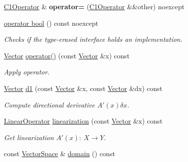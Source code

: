 \begin{DoxyCompactItemize}
\item 
\hyperlink{classSpacy_1_1C1Operator}{C1\+Operator} \& {\bfseries operator=} (\hyperlink{classSpacy_1_1C1Operator}{C1\+Operator} \&\&other) noexcept\hypertarget{classSpacy_1_1C1Operator_abc661d2a55983098267ddd90bd9673eb}{}\label{classSpacy_1_1C1Operator_abc661d2a55983098267ddd90bd9673eb}

\item 
\hyperlink{classSpacy_1_1C1Operator_a4efdf099aac5f0b101c69cc8c9c8a48b}{operator bool} () const noexcept
\begin{DoxyCompactList}\small\item\em Checks if the type-\/erased interface holds an implementation. \end{DoxyCompactList}\item 
\hyperlink{classSpacy_1_1Vector}{Vector} \hyperlink{classSpacy_1_1C1Operator_a2a01bf08bf2b6e44955cd606aa3db91d}{operator()} (const \hyperlink{classSpacy_1_1Vector}{Vector} \&x) const \hypertarget{classSpacy_1_1C1Operator_a2a01bf08bf2b6e44955cd606aa3db91d}{}\label{classSpacy_1_1C1Operator_a2a01bf08bf2b6e44955cd606aa3db91d}

\begin{DoxyCompactList}\small\item\em Apply operator. \end{DoxyCompactList}\item 
\hyperlink{classSpacy_1_1Vector}{Vector} \hyperlink{classSpacy_1_1C1Operator_a1b6a06c88bc4168c750ee4ffdc81f1dd}{d1} (const \hyperlink{classSpacy_1_1Vector}{Vector} \&x, const \hyperlink{classSpacy_1_1Vector}{Vector} \&dx) const \hypertarget{classSpacy_1_1C1Operator_a1b6a06c88bc4168c750ee4ffdc81f1dd}{}\label{classSpacy_1_1C1Operator_a1b6a06c88bc4168c750ee4ffdc81f1dd}

\begin{DoxyCompactList}\small\item\em Compute directional derivative $A'(x)\delta x$. \end{DoxyCompactList}\item 
\hyperlink{classSpacy_1_1LinearOperator}{Linear\+Operator} \hyperlink{classSpacy_1_1C1Operator_a71aabe09ec29a8a1bb197eef035d6672}{linearization} (const \hyperlink{classSpacy_1_1Vector}{Vector} \&x) const \hypertarget{classSpacy_1_1C1Operator_a71aabe09ec29a8a1bb197eef035d6672}{}\label{classSpacy_1_1C1Operator_a71aabe09ec29a8a1bb197eef035d6672}

\begin{DoxyCompactList}\small\item\em Get linearization $A'(x):\ X\to Y $. \end{DoxyCompactList}\item 
const \hyperlink{classSpacy_1_1VectorSpace}{Vector\+Space} \& \hyperlink{classSpacy_1_1C1Operator_aee0ffd5cee0b8a8df2f0b67b5aaf0ddb}{domain} () const \hypertarget{classSpacy_1_1C1Operator_aee0ffd5cee0b8a8df2f0b67b5aaf0ddb}{}\label{classSpacy_1_1C1Operator_aee0ffd5cee0b8a8df2f0b67b5aaf0ddb}


\end{DoxyCompactItemize}
